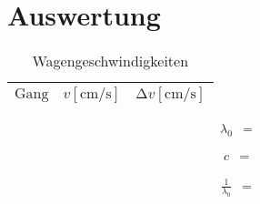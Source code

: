 \section{Auswertung}
\label{sec:Auswertung}







\begin{table}[H]
  \centering
  \caption{Wagengeschwindigkeiten}
  \label{tab:Geschwindigkeiten}
  \begin{tabular}{c c c}
    \toprule
    {$\text{Gang}$} & {$v [\si{\centi\metre\per\second}]$} & {$\increment v [\si{\centi\metre\per\second}]$}\\
    \midrule
    
    \bottomrule
  \end{tabular}
\end{table}



\begin{align*}
  \lambda_0 &= 
\end{align*}



\begin{align*}
  c &= 
\end{align*}

\begin{align*}
  \frac{1}{\lambda_0} &= 
\end{align*}








%
%    
%
